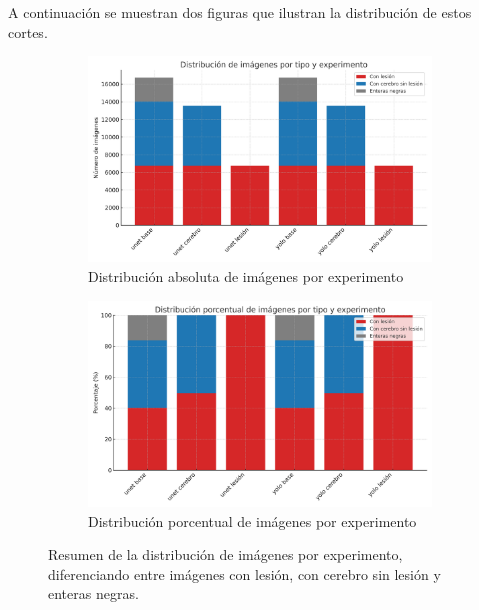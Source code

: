\documentclass[../main.tex]{subfiles}
\begin{document}
A continuación se muestran dos figuras que ilustran la distribución de estos cortes.
\begin{figure}[H]
    \centering
    \begin{subfigure}[b]{0.48\linewidth}
        \centering
        \includegraphics[width=\linewidth]{imgs/metodologia/dist_total.png}
        \caption{Distribución absoluta de imágenes por experimento}
        \label{fig:distribucion_absoluta}
    \end{subfigure}
    \hfill
    \begin{subfigure}[b]{0.48\linewidth}
        \centering
        \includegraphics[width=\linewidth]{imgs/metodologia/dist_porc.png}
        \caption{Distribución porcentual de imágenes por experimento}
        \label{fig:distribucion_porcentual}
    \end{subfigure}
    \caption{Resumen de la distribución de imágenes por experimento, diferenciando entre imágenes con lesión, con cerebro sin lesión y enteras negras.}
    \label{fig:distribucion_experimentos}
\end{figure}
\end{document}
